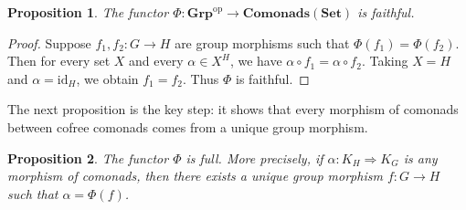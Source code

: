 \documentclass{amsart}
\newtheorem{proposition}{Proposition}
\begin{document}
\begin{proposition}\label{prop:faithfulness}
The functor $\Phi \colon \mathbf{Grp}^{\mathrm{op}} \rightarrow \mathbf{Comonads}(\mathbf{Set})$ is faithful.
\end{proposition}

\begin{proof}
Suppose $f_1, f_2 \colon G \rightarrow H$ are group morphisms such that $\Phi(f_1) = \Phi(f_2)$. 
Then for every set $X$ and every $\alpha \in X^H$, we have $\alpha \circ f_1 = \alpha \circ f_2$. 
Taking $X = H$ and $\alpha = \mathrm{id}_H$, we obtain $f_1 = f_2$. 
Thus $\Phi$ is faithful.
\end{proof}

The next proposition is the key step: it shows that every morphism of comonads between cofree comonads comes from a unique group morphism.

\begin{proposition}\label{prop:fullness}
The functor $\Phi$ is full. 
More precisely, if $\alpha \colon K_H \Longrightarrow K_G$ is any morphism of comonads, then there exists a unique group morphism $f \colon G \longrightarrow H$ such that $\alpha = \Phi(f)$.
\end{proposition}
\end{document}
